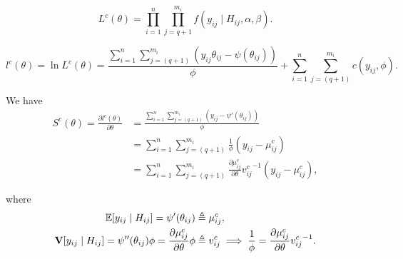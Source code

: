 \documentclass[UTF8,a4paper,10pt]{article}
\begin{document}
\[L^c(\theta) =  \prod_{i=1}^{n} \prod_{j=q+1}^{m_i} f\left(y_{ij}\mid H_{ij}, \alpha, \beta\right).\]

\[l^c(\theta) = \ln L^c(\theta) = \dfrac{\sum_{i=1}^{n}\sum_{j = (q+1)}^{m_i}(y_{ij}\theta_{ij}-\psi(\theta_{ij}))}{\phi}+\sum_{i=1}^{n}\sum_{j = (q+1)}^{m_i}c(y_{ij},\phi).\]


We have
\begin{align*}
  S^c(\theta) = \frac{\partial l^c(\theta)}{\partial \theta} &= \frac{\sum_{i=1}^{n}\sum_{j = (q+1)}^{m_i}(y_{ij}-\psi'(\theta_{ij}))}{\phi}\\
  & = \sum_{i=1}^{n}\sum_{j = (q+1)}^{m_i} \frac{1}{\phi} (y_{ij}-\mu_{ij}^c)\\
  & = \sum_{i=1}^{n}\sum_{j = (q+1)}^{m_i}\frac{\partial \mu_{ij}^c}{\partial \theta}{v_{ij}^c}^{-1}(y_{ij}-\mu_{ij}^c),
\end{align*}


where
\begin{align*}
\operatorname{\mathbb{E}}[y_{ij}\mid H_{ij}] = \psi'(\theta_{ij}) &\triangleq \mu_{ij}^c,\\
\operatorname{\mathbf{V}}[y_{ij}\mid H_{ij}] = \psi''(\theta_{ij}) \phi
 = \frac{\partial \mu_{ij}^c}{\partial\theta}\phi &\triangleq v_{ij}^c \implies \frac{1}{\phi} = \frac{\partial \mu_{ij}^c}{\partial\theta} {v_{ij}^c}^{-1}.
\end{align*}




\pagebreak
\end{document}
